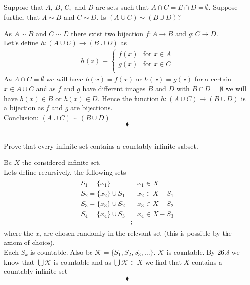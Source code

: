 \subsection{}
\begin{tcolorbox}
Suppose that $A,\, B,\, C,$ and $D$ are sets such that $A \cap C = B\cap D=\emptyset$. Suppose further that $A\sim  B$ and $C\sim  D$. Is $(A \cup C) \sim (B\cup  D)$? 
\end{tcolorbox}
$$ $$
As $A\sim  B$ and $C\sim  D$ there exist two bijection $f: A\rightarrow B$ and $g: C\rightarrow D$.\\ 
Let's define $h: (A \cup C) \rightarrow (B\cup  D)$ as 
\begin{align*}
h(x)=\left\{\begin{array}{ll}
f(x)&\text{for } x\in A\\
g(x)&\text{for } x\in C\\
\end{array}\right.
\end{align*}
As $A\cap C=\emptyset$ we will have $h(x)=f(x)$ or $h(x)=g(x)$ for a certain $x\in A\cup C$ and as $f$ and $g$ have different images $B$ and $D$ with $B\cap D=\emptyset$ we will have $h(x)\in B$ or $h(x)\in D$. Hence the function $h: (A \cup C) \rightarrow (B\cup  D)$ is a bijection as $f$ and $g$ are bijections. \\
Conclusion: $(A \cup C) \sim (B\cup  D)$
$$\blacklozenge$$

\subsection{}
\begin{tcolorbox}
Prove that every infinite set contains a countably infinite subset. 
\end{tcolorbox}
$$ $$
Be $X$ the considered infinite set.\\
Lets define recursively, the following sets
\begin{align*}
\begin{array}{lll}
S_1=\{x_1\}&&x_1\in X\\
S_2=\{x_2\}\cup S_1&&x_2\in X-S_1\\
S_3=\{x_3\}\cup S_2&&x_3\in X-S_2\\
S_4=\{x_4\}\cup S_3&&x_4\in X-S_3\\
&\vdots&
\end{array}
\end{align*}
where the $x_i$ are chosen randomly in the relevant set (this is possible by the axiom of choice).\\
Each $S_k$ is countable. Also be $\mathscr{K}=\{S_1,S_2,S_3,\dots\}$.  $\mathscr{K}$ is countable. By $\mathbf{26.8}$ we know that $\bigcup\mathscr{K}$ is countable and as $\bigcup\mathscr{K}\subset X$ we find that $X$ contains a countably infinite set.
$$\blacklozenge$$
\newpage
